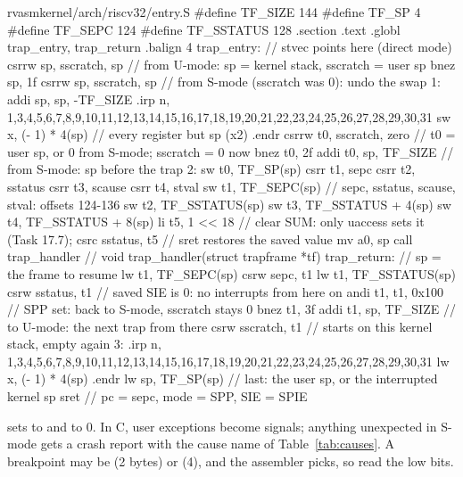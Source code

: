 \documentclass[11pt,a4paper]{article}
\begin{document}
\begin{lst}{rvasm}{kernel/arch/riscv32/entry.S}
#define TF_SIZE 144
#define TF_SP 4
#define TF_SEPC 124
#define TF_SSTATUS 128
    .section .text
    .globl trap_entry, trap_return
    .balign 4
trap_entry:                         // stvec points here (direct mode)
    csrrw sp, sscratch, sp          // from U-mode: sp = kernel stack, sscratch = user sp
    bnez  sp, 1f
    csrrw sp, sscratch, sp          // from S-mode (sscratch was 0): undo the swap
1:  addi  sp, sp, -TF_SIZE
    .irp n, 1,3,4,5,6,7,8,9,10,11,12,13,14,15,16,17,18,19,20,21,22,23,24,25,26,27,28,29,30,31
    sw    x\n, (\n - 1) * 4(sp)     // every register but sp (x2)
    .endr
    csrrw t0, sscratch, zero        // t0 = user sp, or 0 from S-mode; sscratch = 0 now
    bnez  t0, 2f
    addi  t0, sp, TF_SIZE           // from S-mode: sp before the trap
2:  sw    t0, TF_SP(sp)
    csrr  t1, sepc
    csrr  t2, sstatus
    csrr  t3, scause
    csrr  t4, stval
    sw    t1, TF_SEPC(sp)           // sepc, sstatus, scause, stval: offsets 124-136
    sw    t2, TF_SSTATUS(sp)
    sw    t3, TF_SSTATUS + 4(sp)
    sw    t4, TF_SSTATUS + 8(sp)
    li    t5, 1 << 18               // clear SUM: only uaccess sets it (Task 17.7);
    csrc  sstatus, t5               //   sret restores the saved value
    mv    a0, sp
    call  trap_handler              // void trap_handler(struct trapframe *tf)
trap_return:                        // sp = the frame to resume
    lw    t1, TF_SEPC(sp)
    csrw  sepc, t1
    lw    t1, TF_SSTATUS(sp)
    csrw  sstatus, t1               // saved SIE is 0: no interrupts from here on
    andi  t1, t1, 0x100             // SPP set: back to S-mode, sscratch stays 0
    bnez  t1, 3f
    addi  t1, sp, TF_SIZE           // to U-mode: the next trap from there
    csrw  sscratch, t1              //   starts on this kernel stack, empty again
3:  .irp n, 1,3,4,5,6,7,8,9,10,11,12,13,14,15,16,17,18,19,20,21,22,23,24,25,26,27,28,29,30,31
    lw    x\n, (\n - 1) * 4(sp)
    .endr
    lw    sp, TF_SP(sp)             // last: the user sp, or the interrupted kernel sp
    sret                            // pc = sepc, mode = SPP, SIE = SPIE
\end{lst}

 sets  to  and  to 0. In C, user exceptions become
signals; anything unexpected in S-mode gets a crash report with the cause name of Table~\ref{tab:causes}. A breakpoint
may be  (2 bytes) or  (4), and the assembler picks, so read the low bits.
\end{document}
